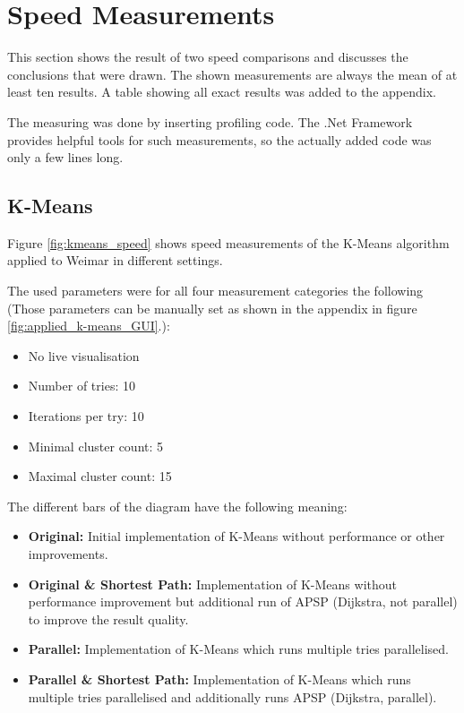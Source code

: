 \section{Speed Measurements} \label{sec:measurements-speed}
This section shows the result of two speed comparisons and discusses the conclusions that were drawn. The shown measurements are always the mean of at least ten results. A table showing all exact results was added to the appendix.

The measuring was done by inserting profiling code. The .Net Framework provides helpful tools for such measurements, so the actually added code was only a few lines long.


\subsection{K-Means}
Figure \ref{fig:kmeans_speed} shows speed measurements of the K-Means algorithm applied to Weimar in different settings.

The used parameters were for all four measurement categories the following (Those parameters can be manually set as shown in the appendix in figure \ref{fig:applied_k-means_GUI}.):

\begin{itemize}
    \item No live visualisation
    \item Number of tries: 10
    \item Iterations per try: 10
    \item Minimal cluster count: 5
    \item Maximal cluster count: 15
\end{itemize}

The different bars of the diagram have the following meaning:

\begin{itemize}
    \item \textbf{Original:} Initial implementation of K-Means without performance or other improvements.
    \item \textbf{Original \& Shortest Path:} Implementation of K-Means without performance improvement but additional run of \acrshort{APSP} (Dijkstra, not parallel) to improve the result quality.
    \item \textbf{Parallel:} Implementation of K-Means which runs multiple tries parallelised.
    \item \textbf{Parallel \& Shortest Path:} Implementation of K-Means which runs multiple tries parallelised and additionally runs \acrshort{APSP} (Dijkstra, parallel).
\end{itemize}

